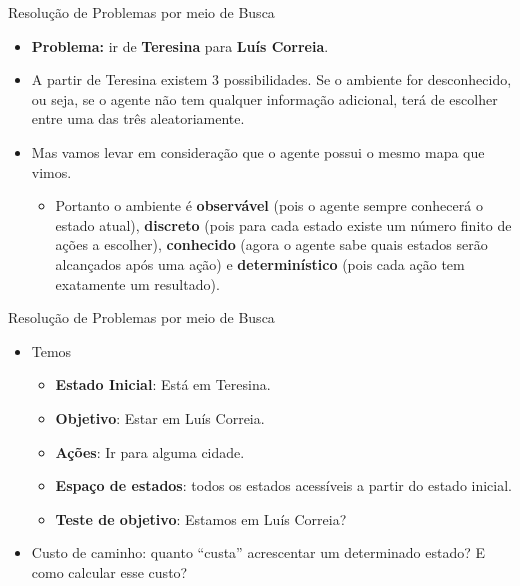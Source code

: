 \documentclass{libs/ufc_format}
\begin{document}
\begin{frame}{Resolução de Problemas por meio de Busca}
    \begin{itemize}
        \justifying
        \item \textbf{Problema:} ir de \textbf{Teresina} para \textbf{Luís Correia}.
        \item<2-> A partir de Teresina existem 3 possibilidades. Se o ambiente for desconhecido, ou seja, se o agente não tem qualquer informação adicional, terá de escolher entre uma das três aleatoriamente.
        \item<3-> Mas vamos levar em consideração que o agente possui o mesmo mapa que vimos.
            \begin{itemize}
                \justifying
                \item<3-> Portanto o ambiente é \textbf{observável} (pois o agente sempre conhecerá o estado atual), \textbf{discreto} (pois para cada estado existe um número finito de ações a escolher), \textbf{conhecido} (agora o agente sabe quais estados serão alcançados após uma ação) e \textbf{determinístico} (pois cada ação tem exatamente um resultado).
            \end{itemize}
    \end{itemize}
\end{frame}

\begin{frame}{Resolução de Problemas por meio de Busca}
    \begin{itemize}
        \justifying
        \item Temos
            \begin{itemize}
                \justifying
                \item \textbf{Estado Inicial}: Está em Teresina.
                \item \textbf{Objetivo}: Estar em Luís Correia.
                \item \textbf{Ações}: Ir para alguma cidade.
                \item \textbf{Espaço de estados}: todos os estados acessíveis a partir do estado inicial.
                \item \textbf{Teste de objetivo}: Estamos em Luís Correia?
            \end{itemize}
        \item<2-> Custo de caminho: quanto ``custa'' acrescentar um determinado estado? E como calcular esse custo?
    \end{itemize}
\end{frame}
\end{document}
